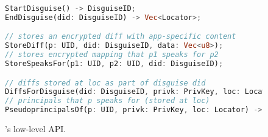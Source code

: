 \begin{figure}[t]
\begin{lstlisting}[language=Rust, style=rust]
StartDisguise() -> DisguiseID;
EndDisguise(did: DisguiseID) -> Vec<Locator>;

// stores an encrypted diff with app-specific content
StoreDiff(p: UID, did: DisguiseID, data: Vec<u8>);
// stores encrypted mapping that p1 speaks for p2
StoreSpeaksFor(p1: UID, p2: UID, did: DisguiseID);

// diffs stored at loc as part of disguise did
DiffsForDisguise(did: DisguiseID, privk: PrivKey, loc: Locator) -> Vec<Vec<u8>>;
// principals that p speaks for (stored at loc)
PseudoprincipalsOf(p: UID, privk: PrivKey, loc: Locator) -> Vec<UID>;
\end{lstlisting}
\caption{\sys's low-level API.}
\label{f:api-low}
\end{figure}


